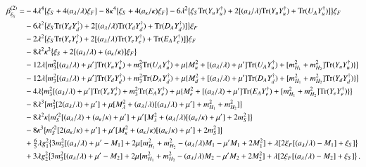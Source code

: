 \documentclass[final,3p,times,pdflatex]{elsarticle}
\newcommand{\lamsq}{\lambda^2}
\newcommand{\kapsq}{\kappa^2}
\newcommand{\tr}{\mathrm{Tr}}
\newcommand{\mhusq}{m^2_{H_2}}
\newcommand{\mhdsq}{m^2_{H_1}}
\newcommand{\mlamsq}{M_\lambda^2}
\newcommand{\mkapsq}{M_\kappa^2}
\newcommand{\mssq}{m_S^2}
\newcommand{\mtrisq}{m_3^2}
\newcommand{\msprsq}{m_S'^2}
\newcommand{\Alam}{a_\lambda/\lambda}
\newcommand{\Akap}{a_\kappa/\kappa}
\newcommand{\Musq}{M_u^2}
\newcommand{\Mdsq}{M_d^2}
\newcommand{\Mesq}{M_e^2}
\begin{document}
\begin{align}
\beta_{\xi^{}_S}^{(2)} =& -4\lambda^4\big\{ \xi_S + 4(\Alam)\xi_F\big\} 
- 8\kappa^4\big\{ \xi_S + 4(\Akap)\xi_F\big\} 
-6\lamsq\big\{ \xi_S\tr( Y_u Y_u^\dagger)+ 2[(\Alam)\tr( Y_u Y_u^\dagger) + \tr( U_A Y_u^\dagger)]\big\}\xi_F \notag \\
%
&-6\lamsq\big\{\xi_S\tr( Y_d Y_d^\dagger) + 2[(\Alam)\tr( Y_d Y_d^\dagger) + \tr( D_A Y_d^\dagger)]\big\}\xi_F  \notag \\
%
&-2\lamsq\big\{\xi_S\tr( Y_e Y_e^\dagger) + 2[(\Alam)\tr( Y_e Y_e^\dagger) + \tr( E_A Y_e^\dagger)]\big\}\xi_F \notag \\
%
&-8\lamsq\kapsq\big\{ \xi_S + 2[(\Alam) + (\Akap)]\xi_F\big\} \notag \\
%
&-12\lambda\big\{ \mtrisq[(\Alam) + \mu']\tr( Y_u Y_u^\dagger) + \mtrisq\tr( U_A Y_u^\dagger)
+ \mu\{\Musq + [(\Alam) + \mu']\tr( U_A Y_u^\dagger) + [\mhdsq + \mhusq]\tr( Y_u Y_u^\dagger)\} \big\} \notag \\
%
&-12\lambda\big\{ \mtrisq[(\Alam) + \mu']\tr( Y_d Y_d^\dagger) + \mtrisq\tr( D_A Y_d^\dagger)
+ \mu\{\Mdsq + [(\Alam) +\mu']\tr( D_A Y_d^\dagger) + [\mhdsq + \mhusq]\tr( Y_d Y_d^\dagger)\} \big\}  \notag \\
%
&-4\lambda\big\{ \mtrisq[(\Alam)+ \mu']\tr( Y_e Y_e^\dagger) + \mtrisq\tr( E_A Y_e^\dagger)
+ \mu\{\Mesq + [(\Alam) +\mu']\tr( E_A Y_e^\dagger) + [\mhdsq + \mhusq]\tr( Y_e Y_e^\dagger)\} \big\} \notag \\
%
&-8\lambda^3\big\{ \mtrisq[2(\Alam) + \mu'] + \mu[\mlamsq + (\Alam)[(\Alam) + \mu'] + \mhdsq + \mhusq]\big\} \notag \\
%
&-8\lamsq\kappa\big\{ \msprsq[(\Alam) + (\Akap) + \mu']
+ \mu'[\mlamsq + (\Alam)[(\Akap) + \mu'] + 2\mssq] \big\} \notag \\
%
&-8\kappa^3\big\{ \msprsq[2(\Akap) + \mu'] 
+ \mu'[\mkapsq + (\Akap)[(\Akap) + \mu'] + 2\mssq] \big\} \notag \\
%
&+ \tfrac{6}{5}\lambda g_1^2\big\{ 3\mtrisq[(\Alam) + \mu' - M_1]
+ 2\mu[\mhdsq + \mhusq -(\Alam)M_1 - \mu' M_1 + 2M_1^2] 
+ \lambda[2\xi_F[(\Alam) - M_1]  + \xi_S] \big\} \notag \\
%
&+ 3\lambda g_2^2\big\{ 3\mtrisq[(\Alam) + \mu' - M_2]
+ 2\mu[\mhdsq + \mhusq - (\Alam)M_2 - \mu' M_2 + 2M_2^2] 
+ \lambda[2\xi_F[(\Alam) - M_2] + \xi_S] \big\}\,.
\end{align}
\end{document}
